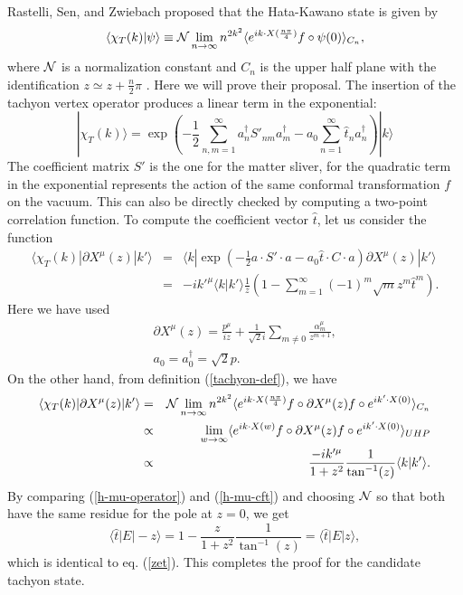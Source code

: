\documentclass[a4paper,12pt]{article}
\begin{document}
Rastelli, Sen, and Zwiebach proposed that the Hata-Kawano state is
given by
\begin{equation}\label{tachyon-def}
\langle \chi_T(k)|\psi\rangle\equiv {\cal
N}\lim_{n\rightarrow\infty}n^{2k^2}\langle e^{ik\cdot
X(\frac{n\pi}{4})} f\circ\psi(0)\rangle_{C_n},
\end{equation}
where ${\cal N}$ is a normalization constant and $C_n$ is the upper 
half plane with the identification $z \simeq z+\frac{n}{2}\pi$ 
\cite{RSZboundary}.
Here we will prove their proposal.
 The insertion of the
tachyon vertex operator produces a linear term in the exponential:
\begin{equation}
|\chi_T(k)\rangle=\exp\left(-\frac{1}{2}\sum_{n,m=1}^{\infty}
a^{\dagger}_n S'_{nm} a^{\dagger}_m
-a_0 \sum_{n=1}^{\infty}\widehat{t}_n a^{\dagger}_n\right)|k\rangle
\end{equation}
The coefficient matrix $S'$ is the one for the matter sliver, for
the quadratic term in the exponential represents the action of the
same conformal transformation $f$ on the vacuum. This can also be
directly checked by computing a two-point correlation function. To
compute the coefficient vector $\widehat{t}$, let us consider the
function
\begin{eqnarray}
\langle\chi_T(k)|\partial X^{\mu}(z)|k'\rangle
&=&
\langle k|\exp\left(-\frac{1}{2}a\cdot S'\cdot a
-a_0 \widehat{t}\cdot C\cdot a\right)\partial X^{\mu}(z)|k'\rangle \\
&=& -ik'^{\mu}\langle k|k'\rangle \frac{1}{z}
\left(1-\sum_{m=1}^{\infty}(-1)^m\sqrt{m}z^m\widehat{t}^m\right).
\label{h-mu-operator}
\end{eqnarray}
Here we have used
\begin{eqnarray}
&&\partial X^{\mu}(z)=\frac{p^{\mu}}{iz}+\frac{1}{\sqrt{2}i}\sum_{m\neq 0}
\frac{\alpha_m^{\mu}}{z^{m+1}},\\
&&a_0=a_0^{\dagger}=\sqrt{2}p.
\end{eqnarray}
On the other hand, from definition (\ref{tachyon-def}), we have
\begin{eqnarray}
\langle\chi_T(k)|\partial X^{\mu}(z)|k'\rangle
&=&{\cal N}\lim_{n\rightarrow\infty}n^{2k^2}\langle
e^{ik\cdot X(\frac{n\pi}{4})} f\circ\partial X^{\mu}(z)
 f\circ e^{ik'\cdot X(0)}\rangle_{C_n}\\
&\propto&
\lim_{w\rightarrow\infty}\langle e^{ik\cdot X(w)}
f\circ\partial X^{\mu}(z)f\circ e^{ik'\cdot X(0)}\rangle_{UHP} \\
&\propto&
\frac{-ik'^{\mu}}{1+z^2}\frac{1}{\tan^{-1}(z)}\langle k|k'\rangle.\label{h-mu-cft}
\end{eqnarray}
By comparing (\ref{h-mu-operator}) and (\ref{h-mu-cft}) and
choosing ${\cal N}$ so that both have the same residue for the pole at $z=0$,
we get
\begin{equation}
\langle \widehat{t}|E|-z\rangle
=1-\frac{z}{1+z^2}\frac{1}{\tan^{-1}(z)}
=\langle \widehat{t}|E|z\rangle
,
\end{equation}
which is identical to eq. (\ref{zet}). This completes the proof
for the candidate tachyon state.
\end{document}
